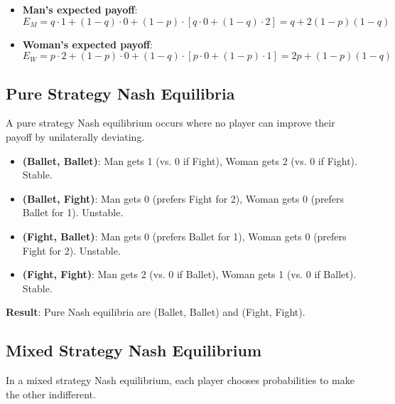 \documentclass[a4paper,12pt]{article}
\begin{document}
\begin{itemize}
\item \textbf{Man's expected payoff}:
\[
E_M = q \cdot 1 + (1-q) \cdot 0 + (1-p) \cdot [q \cdot 0 + (1-q) \cdot 2] = q + 2(1-p)(1-q)
\]
\item \textbf{Woman's expected payoff}:
\[
E_W = p \cdot 2 + (1-p) \cdot 0 + (1-q) \cdot [p \cdot 0 + (1-p) \cdot 1] = 2p + (1-p)(1-q)
\]
\end{itemize}

\subsection{Pure Strategy Nash Equilibria}
A pure strategy Nash equilibrium occurs where no player can improve their payoff by unilaterally deviating.

\begin{itemize}
\item \textbf{(Ballet, Ballet)}: Man gets 1 (vs. 0 if Fight), Woman gets 2 (vs. 0 if Fight). Stable.
\item \textbf{(Ballet, Fight)}: Man gets 0 (prefers Fight for 2), Woman gets 0 (prefers Ballet for 1). Unstable.
\item \textbf{(Fight, Ballet)}: Man gets 0 (prefers Ballet for 1), Woman gets 0 (prefers Fight for 2). Unstable.
\item \textbf{(Fight, Fight)}: Man gets 2 (vs. 0 if Ballet), Woman gets 1 (vs. 0 if Ballet). Stable.
\end{itemize}

\textbf{Result}: Pure Nash equilibria are (Ballet, Ballet) and (Fight, Fight).

\subsection{Mixed Strategy Nash Equilibrium}
In a mixed strategy Nash equilibrium, each player chooses probabilities to make the other indifferent.
\end{document}
